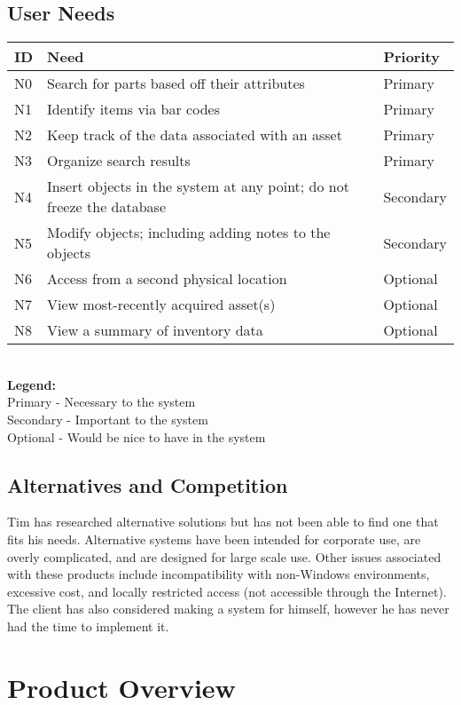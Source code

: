 \documentclass{article}
\begin{document}
\subsection{User Needs}
\begin{tabular}{ | p{0.15in} | p{4.0in} | p{.75in} |}
\hline
\textbf{ID} & \textbf{Need} & \textbf{Priority} \\
\hline
\hline
N0 & Search for parts based off their attributes & Primary \\
\hline
N1 & Identify items via bar codes & Primary \\
\hline
N2 & Keep track of the data associated with an asset & Primary \\
\hline
N3 & Organize search results & Primary \\
\hline
N4 & Insert objects in the system at any point; do not freeze the database & Secondary \\
\hline
N5 & Modify objects; including adding notes to the objects & Secondary \\
\hline
N6 & Access from a second physical location & Optional \\
\hline
N7 & View most-recently acquired asset(s) & Optional \\
\hline
N8 & View a summary of inventory data & Optional \\
\hline
\end{tabular} \\
\textbf{Legend:} \\
Primary - Necessary to the system \\
Secondary - Important to the system \\
Optional - Would be nice to have in the system \\

\subsection{Alternatives and Competition}
Tim has researched alternative solutions but has not been able to find one that fits his needs.  Alternative systems have been intended for corporate use, are overly complicated, and are designed for large scale use.  Other issues associated with these products include incompatibility with non-Windows environments, excessive cost, and locally restricted access (not accessible through the Internet).  The client has also considered making a system for himself, however he has never had the time to implement it.

\section{Product Overview}
\end{document}
